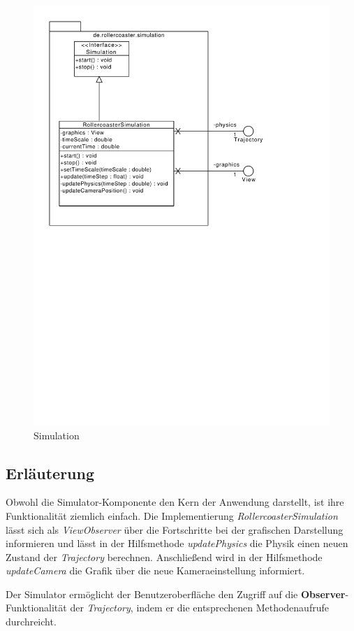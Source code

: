 \begin{figure}
\includegraphics[width=\linewidth]{bilder/Simulation}
\caption{Simulation}
\label{fig:simulation}
\end{figure}

\subsection{Erläuterung}

Obwohl die Simulator-Komponente den Kern der Anwendung darstellt, ist ihre Funktionalität
ziemlich einfach. Die Implementierung \emph{RollercoasterSimulation} lässt sich als
\emph{ViewObserver} über die Fortschritte bei der grafischen Darstellung informieren
und lässt in der Hilfsmethode \emph{updatePhysics} die Physik einen neuen Zustand 
der \emph{Trajectory} berechnen. Anschließend wird in der Hilfsmethode \emph{updateCamera}
die Grafik über die neue Kameraeinstellung informiert.

Der Simulator ermöglicht der Benutzeroberfläche den Zugriff auf die \textbf{Observer}-
Funktionalität der \emph{Trajectory}, indem er die entsprechenen Methodenaufrufe durchreicht.
